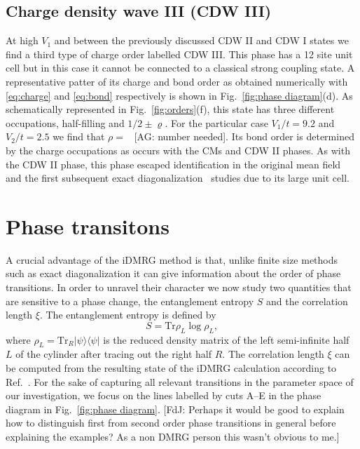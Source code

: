 \documentclass[aps,prx,10pt,twocolumn,floatfix,superscriptaddress,showpacs,numerical,footinbib]{revtex4-1}
\newcommand{\ket}[1]{| #1 \rangle}
\newcommand{\bra}[1]{\langle #1 |}
\newcommand{\noteAG}[1]{{\color{blue} [AG: #1]}}
\newcommand{\noteFdJ}[1]{{\color{cyan} [FdJ: #1]}}
\begin{document}
\subsection{Charge density wave III (CDW III)}
%
At high $V_{1}$ and between the previously discussed CDW II and CDW I states
we find a third type of charge order labelled CDW III.
%
This phase has a 12 site unit cell but in this case it cannot be connected to a classical strong coupling state.
%
A representative patter of its charge and bond order as obtained numerically 
with \eqref{eq:charge} and \eqref{eq:bond} respectively
is shown in Fig.~\ref{fig:phase diagram}(d).
%
As schematically represented in Fig.~\ref{fig:orders}(f), this state has three 
different occupations, half-filling and $1/2\pm\varrho$.
%
For the particular case $V_{1}/t=9.2$ and $V_{2}/t=2.5$ we find that $\rho=$~\noteAG{number needed}.
%
Its bond order is determined by the charge occupations 
as occurs with the CMs and CDW II phases.
%
As with the CDW II phase, this phase escaped
identification in the original mean field~\cite{RQHZ08,WF10,GCC13} 
and the first subsequent exact diagonalization~\cite{GGNVC13,DH14,DCH14} studies 
due to its large unit cell.
%
 




\section{\label{sec:phasetransitions} Phase transitons}
%
A crucial advantage of the iDMRG method is that, unlike finite
size methods such as exact diagonalization it can give information about the order of phase transitions.
%
In order to unravel their character we now study two quantities that are sensitive
to a phase change, the entanglement entropy $S$ and the correlation length $\xi$.
%
The entanglement entropy is defined by
%
\begin{equation}
 S = \mathrm{Tr} \rho_L \log \rho_L,
\end{equation}
%
where $\rho_L = \mathrm{Tr}_R \ket{\psi}\bra{\psi}$ is the reduced density matrix of the left semi-infinite half $L$ of the cylinder after tracing out the right half $R$.
%
The correlation length $\xi$ can be computed from the resulting state of the iDMRG calculation according to Ref.~\cite{KZM13}.
%
For the sake of capturing all relevant transitions in the parameter space of our investigation, we focus on the lines labelled by cuts A--E in the phase diagram in Fig.~\ref{fig:phase diagram}.
%
\noteFdJ{Perhaps it would be good to explain how to distinguish first from second order phase transitions in general before explaining the examples? As a non DMRG person this wasn't obvious to me.}
\end{document}
